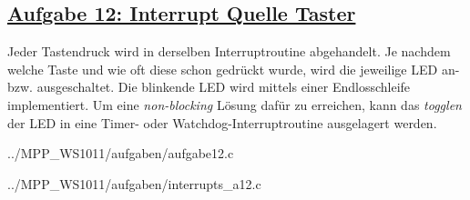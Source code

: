 \subsection
{\href{http://cst.mi.fu-berlin.de/intern/19606-P-MPP/Aufgaben/040401.html}
{Aufgabe 12: Interrupt Quelle Taster}}
Jeder Tastendruck wird in derselben Interruptroutine abgehandelt. Je nachdem welche Taste und wie oft diese schon gedrückt wurde, wird die jeweilige LED an- bzw. ausgeschaltet. Die blinkende LED wird mittels einer Endlosschleife implementiert.
Um eine \textit{non-blocking} Lösung dafür zu erreichen, kann das \textit{togglen} der LED in eine Timer- oder Watchdog-Interruptroutine ausgelagert werden.

{../MPP_WS1011/aufgaben/aufgabe12.c}


{../MPP_WS1011/aufgaben/interrupts_a12.c}
